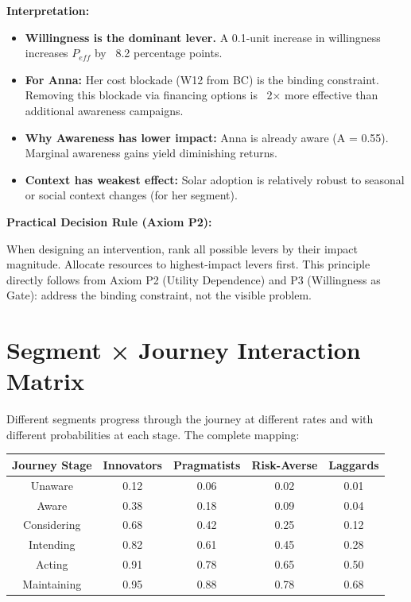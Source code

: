 \textbf{Interpretation:}

\begin{itemize}[nosep]
    \item \textbf{Willingness is the dominant lever.} A 0.1-unit increase in willingness increases $P_{eff}$ by ~8.2 percentage points.

    \item \textbf{For Anna:} Her cost blockade (W12 from BC) is the binding constraint. Removing this blockade via financing options is ~2× more effective than additional awareness campaigns.

    \item \textbf{Why Awareness has lower impact:} Anna is already aware (A = 0.55). Marginal awareness gains yield diminishing returns.

    \item \textbf{Context has weakest effect:} Solar adoption is relatively robust to seasonal or social context changes (for her segment).
\end{itemize}

\textbf{Practical Decision Rule (Axiom P2):}

When designing an intervention, rank all possible levers by their impact magnitude. Allocate resources to highest-impact levers first. This principle directly follows from Axiom P2 (Utility Dependence) and P3 (Willingness as Gate): address the binding constraint, not the visible problem.

\section{Segment × Journey Interaction Matrix}\label{sec:ch16-matrix}

Different segments progress through the journey at different rates and with different probabilities at each stage. The complete mapping:

\begin{center}
\begin{tabular}{|c|c|c|c|c|}
\hline
\textbf{Journey Stage} & \textbf{Innovators} & \textbf{Pragmatists} & \textbf{Risk-Averse} & \textbf{Laggards} \\
\hline
Unaware & 0.12 & 0.06 & 0.02 & 0.01 \\
\hline
Aware & 0.38 & 0.18 & 0.09 & 0.04 \\
\hline
Considering & 0.68 & 0.42 & 0.25 & 0.12 \\
\hline
Intending & 0.82 & 0.61 & 0.45 & 0.28 \\
\hline
Acting & 0.91 & 0.78 & 0.65 & 0.50 \\
\hline
Maintaining & 0.95 & 0.88 & 0.78 & 0.68 \\
\hline
\end{tabular}
\end{center}

